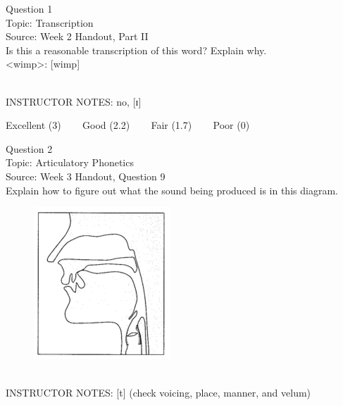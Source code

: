 \documentclass[12pt]{article}
\begin{document}
\begin{center}
\textbf{{\color{blue}{\HUGE START OF EXAM\\}}}

\textbf{{\color{blue}{\HUGE Student ID: 43855\\}}}

\textbf{{\color{blue}{\HUGE \\}}}

\end{center}
\newpage

{\large Question 1}\\

Topic: Transcription\\
Source: Week 2 Handout, Part II\\

Is this a reasonable transcription of this word? Explain why.\\

<wimp>: {[wimp]}


~\\
INSTRUCTOR NOTES: no, [ɪ]


\vfill
Excellent (3) ~~~ Good (2.2) ~~~ Fair (1.7) ~~~ Poor (0)
\newpage

{\large Question 2}\\

Topic: Articulatory Phonetics\\
Source: Week 3 Handout, Question 9\\

Explain how to figure out what the sound being produced is in this diagram.\\

\begin{figure}[H]
\includegraphics{../images/sagittal_t.png}
\end{figure}

~\\
INSTRUCTOR NOTES: [t] (check voicing, place, manner, and velum)
\end{document}

